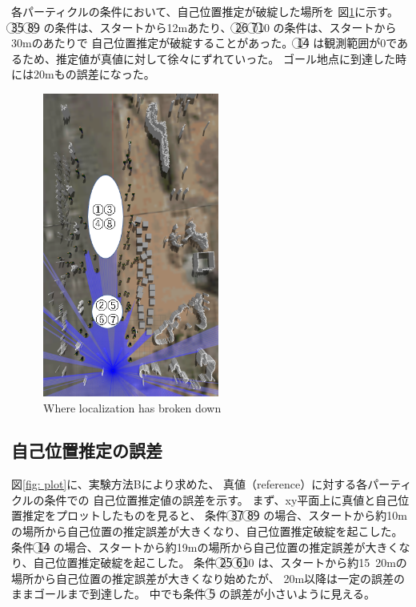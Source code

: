 \documentclass{jarticle}
\begin{document}
各パーティクルの条件において、自己位置推定が破綻した場所を
図\ref{fig: 失敗箇所}に示す。
\textcircled{\scriptsize 3}\textcircled{\scriptsize 5}\noindent
\textcircled{\scriptsize 8}\textcircled{\scriptsize 9}\noindent
の条件は、スタートから12mあたり、
\textcircled{\scriptsize 2}\textcircled{\scriptsize 6}\noindent
\textcircled{\scriptsize 7}\textcircled{\scriptsize 10}\noindent
の条件は、スタートから30mのあたりで
自己位置推定が破綻することがあった。
\textcircled{\scriptsize 1}\textcircled{\scriptsize 4}\noindent
は観測範囲が0であるため、推定値が真値に対して徐々にずれていった。
ゴール地点に到達した時には20mもの誤差になった。

\begin{figure}[htbp]
  \centering
   \includegraphics[height=100mm]{fig/failure_location.png}
   \vspace*{-4mm}
   \caption{Where localization has broken down}
   \label{fig: 失敗箇所}
\end{figure}

\subsection{自己位置推定の誤差}

図\ref{fig: plot}に、実験方法Bにより求めた、
真値（reference）に対する各パーティクルの条件での
自己位置推定値の誤差を示す。
まず、xy平面上に真値と自己位置推定をプロットしたものを見ると、
条件
\textcircled{\scriptsize 3}\textcircled{\scriptsize 7}\noindent
\textcircled{\scriptsize 8}\textcircled{\scriptsize 9}\noindent
の場合、スタートから約10mの場所から自己位置の推定誤差が大きくなり、自己位置推定破綻を起こした。
条件
\textcircled{\scriptsize 1}\textcircled{\scriptsize 4}\noindent
の場合、スタートから約19mの場所から自己位置の推定誤差が大きくなり、自己位置推定破綻を起こした。
条件
\textcircled{\scriptsize 2}\textcircled{\scriptsize 5}\noindent
\textcircled{\scriptsize 6}\textcircled{\scriptsize 10}\noindent
は、スタートから約15~20mの場所から自己位置の推定誤差が大きくなり始めたが、
20m以降は一定の誤差のままゴールまで到達した。
中でも条件
\textcircled{\scriptsize 5}\noindent
の誤差が小さいように見える。
\end{document}
